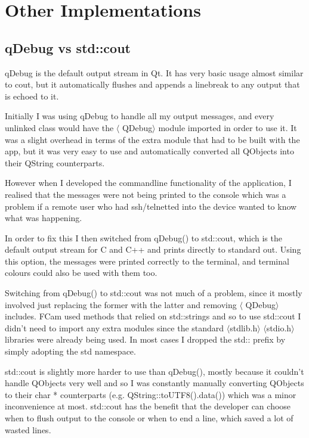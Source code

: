 \section{Other Implementations}

\subsection{qDebug vs std::cout}\label{qdebug}
qDebug is the default output stream in Qt. It has very basic usage almost similar to cout, but it automatically flushes and appends a linebreak to any output that is echoed to it.

Initially I was using qDebug to handle all my output messages, and every unlinked class would have the \(\langle\) QDebug\(\rangle\) module imported in order to use it. It was a slight overhead in terms of the extra module that had to be built with the app, but it was very easy to use and automatically converted all QObjects into their QString counterparts.

However when I developed the commandline functionality of the application, I realised that the messages were not being printed to the console which was a problem if a remote user who had ssh/telnetted into the device wanted to know what was happening.

In order to fix this I then switched from qDebug() to std::cout, which is the default output stream for C and C++ and prints directly to standard out. Using this option, the messages were printed correctly to the terminal, and terminal colours could also be used with them too.

Switching from qDebug() to std::cout was not much of a problem, since it mostly involved just replacing the former with the latter and removing \(\langle\) QDebug\(\rangle\) includes. FCam used methods that relied on std::strings and so to use std::cout I didn't need to import any extra modules since the standard \(\langle\)stdlib.h\(\rangle\) \(\langle\)stdio.h\(\rangle\) libraries were already being used. In most cases I dropped the std:: prefix by simply adopting the std namespace.

std::cout is slightly more harder to use than qDebug(), mostly because it couldn't handle QObjects very well and so I was constantly manually converting QObjects to their char * counterparts (e.g. QString::toUTF8().data()) which was a minor inconvenience at most.
std::cout has the benefit that the developer can choose when to flush output to the console or when to end a line, which saved a lot of wasted lines.

